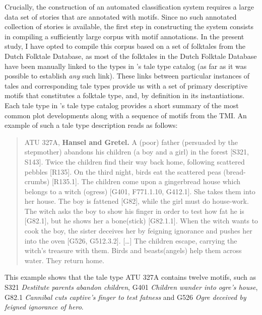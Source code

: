 Crucially, the construction of an automated classification system requires a large data set of stories that are annotated with motifs. Since no such annotated collection of stories is available, the first step in constructing the system consists in compiling a sufficiently large corpus with motif annotations. In the present study, I have opted to compile this corpus based on a set of folktales from the Dutch Folktale Database\autocite{meder:2010}, as most of the folktales in the Dutch Folktale Database have been manually linked to the types in \citeauthor{uther:2004}'s tale type catalog (as far as it was possible to establish \emph{any} such link). These links between particular instances of tales and corresponding tale types provide us with a set of primary descriptive motifs that constitutes a folktale type, and, by definition in its instantiations. Each tale type in \citeauthor{uther:2004}'s tale type catalog provides a short summary of the most common plot developments along with a sequence of motifs from the TMI. An example of such a tale type description reads as follows: 
\begin{quote}
ATU 327A, \textbf{Hansel and Gretel.} A (poor) father (persuaded by the stepmother) abandons his children (a boy and a girl) in the forest [S321, S143]. Twice the children find their way back home, following scattered pebbles [R135]. On the third night, birds eat the scattered peas (bread-crumbs) [R135.1]. The children come upon a gingerbread house which belongs to a witch (ogress) [G401, F771.1.10, G412.1]. She takes them into her house. The boy is fattened [G82], while the girl must do house-work. The witch asks the boy to show his finger in order to test how fat he is [G82.1], but he shows her a bone(stick) [G82.1.1]. When the witch wants to cook the boy, the sister deceives her by feigning ignorance and pushes her into the oven [G526, G512.3.2]. [\ldots] The children escape, carrying the witch's treasure with them.  Birds and beasts(angels) help them across water. They return home.
\end{quote}
This example shows that the tale type ATU 327A contains twelve motifs, such as S321 \emph{Destitute parents abandon children}, G401 \emph{Children wander into ogre's house}, G82.1 \emph{Cannibal cuts captive's finger to test fatness} and G526 \emph{Ogre deceived by feigned ignorance of hero}. 

